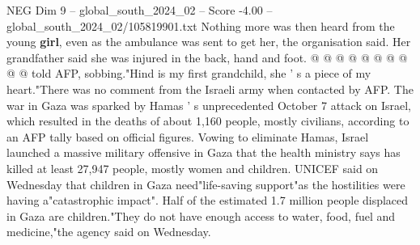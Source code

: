 \begin{textsample}{NEG Dim 9 – global\_south\_2024\_02 – Score -4.00 – global\_south\_2024\_02/105819901.txt}
Nothing more was then heard from the young \textbf{girl}, even as the ambulance was sent to get her, the organisation said.
Her grandfather said she was injured in the back, hand and foot. @ @ @ @ @ @ @ @ @ @ told AFP, sobbing."Hind is my first grandchild, she ' s a piece of my heart."There was no comment from the Israeli army when contacted by AFP.
The war in Gaza was sparked by Hamas ' s unprecedented October 7 attack on Israel, which resulted in the deaths of about 1,160 people, mostly civilians, according to an AFP tally based on official figures.
Vowing to eliminate Hamas, Israel launched a massive military offensive in Gaza that the health ministry says has killed at least 27,947 people, mostly women and children.
UNICEF said on Wednesday that children in Gaza need"life-saving support"as the hostilities were having a"catastrophic impact".
Half of the estimated 1.7 million people displaced in Gaza are children."They do not have enough access to water, food, fuel and medicine,"the agency said on Wednesday.

\end{textsample}
